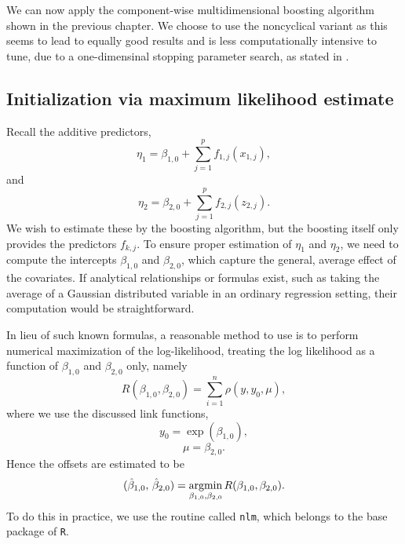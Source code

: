 We can now apply the component-wise multidimensional boosting algorithm shown in the previous chapter.
We choose to use the noncyclical variant as this seems to lead to equally good results and is less computationally intensive to tune, due to a one-dimensinal stopping parameter search, as stated in \citep{schmid}.

\subsection{Initialization via maximum likelihood estimate}
Recall the additive predictors,
\begin{equation}
    \eta_1=\beta_{1,0}+\sum_{j=1}^p f_{1,j}(x_{1,j}),
\end{equation}
and
\begin{equation}
    \eta_2=\beta_{2,0}+\sum_{j=1}^p f_{2,j}(z_{2,j}).
\end{equation}
We wish to estimate these by the boosting algorithm, but the boosting itself only provides the predictors $f_{k,j}$.
To ensure proper estimation of $\eta_1$ and $\eta_2$, we need to compute the intercepts $\beta_{1,0}$ and $\beta_{2,0}$, which capture the general, average effect of the covariates.
If analytical relationships or formulas exist, such as taking the average of a Gaussian distributed variable in an ordinary regression setting, their computation would be straightforward.

In lieu of such known formulas, a reasonable method to use is to perform numerical maximization of the log-likelihood, treating the log likelihood as a function of $\beta_{1,0}$ and $\beta_{2,0}$ only, namely
\begin{equation}
    R(\beta_{1,0},\beta_{2,0})=\sum_{i=1}^n\rho(y,y_0,\mu),
\end{equation}
where we use the discussed link functions,
\begin{equation}
    y_0=\exp(\beta_{1,0}),
\end{equation}
\begin{equation}
    \mu=\beta_{2,0}.
\end{equation}
Hence the offsets are estimated to be
\begin{equation}
    (\hat{\beta}_{1,0},\,\hat{\beta}_{2,0})=\operatorname*{argmin}_{\beta_{1,0},\beta_{2,0}}R(\beta_{1,0},\beta_{2,0}).
\end{equation}
To do this in practice, we use the routine called \verb|nlm|, which belongs to the base package of \verb|R|.

